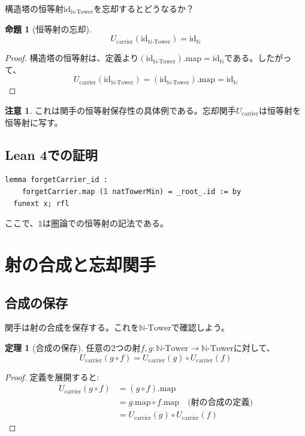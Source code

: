 \documentclass[a4paper,12pt]{article}
\theoremstyle{definition}
\newtheorem{theorem}[definition]{定理}
\newtheorem{proposition}[definition]{命題}
\newtheorem{remark}[definition]{注意}
\begin{document}
構造塔の恒等射$\text{id}_{\mathbb{N}\text{-Tower}}$を忘却するとどうなるか？

\begin{proposition}[恒等射の忘却]\label{prop:forget_id}
\[
U_{\text{carrier}}(\text{id}_{\mathbb{N}\text{-Tower}}) = \text{id}_{\mathbb{N}}
\]
\end{proposition}

\begin{proof}
構造塔の恒等射は、定義より$(\text{id}_{\mathbb{N}\text{-Tower}}).\text{map} = \text{id}_{\mathbb{N}}$である。したがって、
\[
U_{\text{carrier}}(\text{id}_{\mathbb{N}\text{-Tower}}) = (\text{id}_{\mathbb{N}\text{-Tower}}).\text{map} = \text{id}_{\mathbb{N}}
\]
\end{proof}

\begin{remark}
これは関手の恒等射保存性の具体例である。忘却関手$U_{\text{carrier}}$は恒等射を恒等射に写す。
\end{remark}

\subsection{Lean 4での証明}

\begin{lstlisting}[style=leanstyle, language=ML]
lemma forgetCarrier_id :
    forgetCarrier.map (𝟙 natTowerMin) = _root_.id := by
  funext x; rfl
\end{lstlisting}

ここで、\texttt{𝟙}は圏論での恒等射の記法である。

\section{射の合成と忘却関手}

\subsection{合成の保存}

関手は射の合成を保存する。これを$\mathbb{N}\text{-Tower}$で確認しよう。

\begin{theorem}[合成の保存]\label{thm:forget_comp}
任意の2つの射$f, g : \mathbb{N}\text{-Tower} \to \mathbb{N}\text{-Tower}$に対して、
\[
U_{\text{carrier}}(g \circ f) = U_{\text{carrier}}(g) \circ U_{\text{carrier}}(f)
\]
\end{theorem}

\begin{proof}
定義を展開すると:
\begin{align*}
U_{\text{carrier}}(g \circ f) &= (g \circ f).\text{map} \\
&= g.\text{map} \circ f.\text{map} \quad \text{(射の合成の定義)} \\
&= U_{\text{carrier}}(g) \circ U_{\text{carrier}}(f)
\end{align*}
\end{proof}
\end{document}
